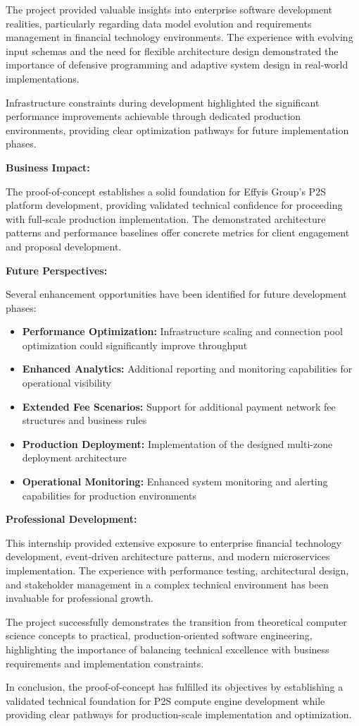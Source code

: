The project provided valuable insights into enterprise software development realities, particularly regarding data model evolution and requirements management in financial technology environments. The experience with evolving input schemas and the need for flexible architecture design demonstrated the importance of defensive programming and adaptive system design in real-world implementations.

Infrastructure constraints during development highlighted the significant performance improvements achievable through dedicated production environments, providing clear optimization pathways for future implementation phases.

\textbf{Business Impact:}

The proof-of-concept establishes a solid foundation for Effyis Group's P2S platform development, providing validated technical confidence for proceeding with full-scale production implementation. The demonstrated architecture patterns and performance baselines offer concrete metrics for client engagement and proposal development.

\textbf{Future Perspectives:}

Several enhancement opportunities have been identified for future development phases:

\begin{itemize}
    \item \textbf{Performance Optimization:} Infrastructure scaling and connection pool optimization could significantly improve throughput
    \item \textbf{Enhanced Analytics:} Additional reporting and monitoring capabilities for operational visibility
    \item \textbf{Extended Fee Scenarios:} Support for additional payment network fee structures and business rules
    \item \textbf{Production Deployment:} Implementation of the designed multi-zone deployment architecture
    \item \textbf{Operational Monitoring:} Enhanced system monitoring and alerting capabilities for production environments
\end{itemize}

\textbf{Professional Development:}

This internship provided extensive exposure to enterprise financial technology development, event-driven architecture patterns, and modern microservices implementation. The experience with performance testing, architectural design, and stakeholder management in a complex technical environment has been invaluable for professional growth.

The project successfully demonstrates the transition from theoretical computer science concepts to practical, production-oriented software engineering, highlighting the importance of balancing technical excellence with business requirements and implementation constraints.

In conclusion, the proof-of-concept has fulfilled its objectives by establishing a validated technical foundation for P2S compute engine development while providing clear pathways for production-scale implementation and optimization.

\pagebreak